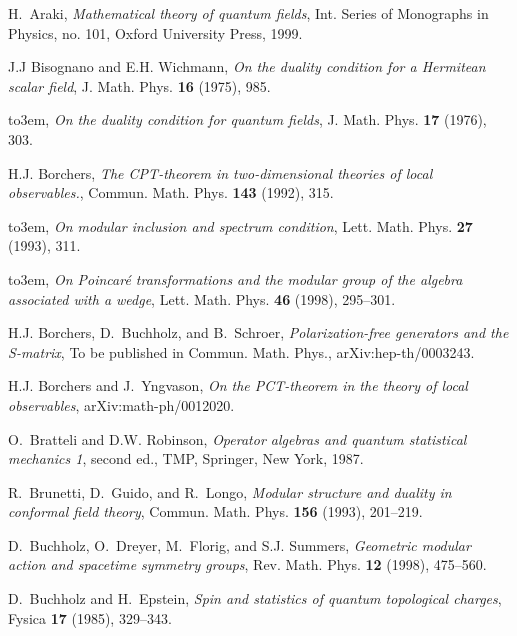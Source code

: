\documentclass[a4paper,reqno,11pt]{amsart}
\theoremstyle{plain}
\theoremstyle{definition}
\numberwithin{equation}{section}
\begin{document}
\providecommand{\bysame}{\leavevmode\hbox to3em{\hrulefill}\thinspace}
\begin{thebibliography}{10}

H.~Araki, \emph{Mathematical theory of quantum fields}, Int. Series of
  Monographs in Physics, no. 101, Oxford University Press, 1999.

J.J Bisognano and E.H. Wichmann, \emph{On the duality condition for a
  {Hermitean} scalar field}, J. Math. Phys. \textbf{16} (1975), 985.

\bysame, \emph{On the duality condition for quantum fields}, J. Math. Phys.
  \textbf{17} (1976), 303.

H.J. Borchers, \emph{The {CPT}-theorem in two-dimensional theories of local
  observables.}, Commun. Math. Phys. \textbf{143} (1992), 315.

\bysame, \emph{On modular inclusion and spectrum condition}, Lett. Math. Phys.
  \textbf{27} (1993), 311.

\bysame, \emph{On {P}oincar\'e transformations and the modular group of the
  algebra associated with a wedge}, Lett. Math. Phys. \textbf{46} (1998),
  295--301.

H.J. Borchers, D.~Buchholz, and B.~Schroer, \emph{Polarization-free generators
  and the {S}-matrix}, To be published in Commun. Math. Phys.,
  arXiv:hep-th/0003243.

H.J. Borchers and J.~Yngvason, \emph{On the {PCT}-theorem in the theory of
  local observables}, arXiv:math-ph/0012020.

O.~Bratteli and D.W. Robinson, \emph{Operator algebras and quantum statistical
  mechanics 1}, second ed., TMP, Springer, New York, 1987.

R.~Brunetti, D.~Guido, and R.~Longo, \emph{Modular structure and duality in
  conformal field theory}, Commun. Math. Phys. \textbf{156} (1993), 201--219.

D.~Buchholz, O.~Dreyer, M.~Florig, and S.J. Summers, \emph{Geometric modular
  action and spacetime symmetry groups}, Rev. Math. Phys. \textbf{12} (1998),
  475--560.

D.~Buchholz and H.~Epstein, \emph{Spin and statistics of quantum topological
  charges}, Fysica \textbf{17} (1985), 329--343.


\end{thebibliography}
\end{document}
